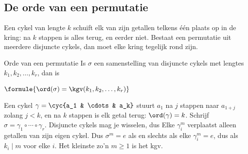 \begin{oefeningen}
\end{oefeningen}

\subsection{De orde van een permutatie}

Een cykel van lengte $k$ schuift elk van zijn getallen telkens één plaats op in de kring: na $k$ stappen is alles terug, en eerder niet. Bestaat een permutatie uit meerdere disjuncte cykels, dan moet elke kring tegelijk rond zijn.

\begin{theorie}
\begin{stelling}{Orde van een permutatie}
Is $\sigma$ een samenstelling van disjuncte cykels met lengtes $k_1, k_2, \ldots, k_r$, dan is

\vspace{1mm}
\qquad $\formule{\ord(\sigma) = \kgv(k_1, k_2, \ldots, k_r)}$
\end{stelling}

\begin{bewijs}
Een cykel $\gamma = \cyc{a_1 & \cdots & a_k}$ stuurt $a_1$ na $j$ stappen naar $a_{1 + j}$ zolang $j < k$, en na $k$ stappen is elk getal terug: $\ord(\gamma) = k$. Schrijf $\sigma = \gamma_1 \circ \cdots \circ \gamma_r$. Disjuncte cykels mag je wisselen, dus
Elke $\gamma_i^m$ verplaatst alleen getallen van zijn eigen cykel. Dus $\sigma^m = e$ als en slechts als elke $\gamma_i^m = e$, dus als $k_i \mid m$ voor elke $i$. Het kleinste zo'n $m \geqslant 1$ is het kgv.
\end{bewijs}
\end{theorie}


